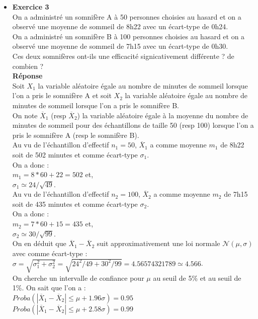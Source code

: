 \documentclass[a4paper,11pt]{book}
\begin{document}
\begin{itemize}
\item{\bf Exercice 3}\\
On a administr\'e un somnif\`ere A \`a 50 personnes choisies au hasard et on a 
observ\'e une moyenne de sommeil de 8h22 avec un \'ecart-type de 0h24.\\ 
On a administr\'e un somnif\`ere B \`a 100 personnes choisies au hasard et on a
observ\'e une moyenne de sommeil de 7h15 avec un \'ecart-type de 0h30.\\ 
Ces deux somnif\`eres ont-ils une efficacit\'e signicativement diff\'erente ? 
de combien ?\\
{\bf R\'eponse}\\
Soit $X_1$ la variable al\'eatoire \'egale au nombre de minutes de sommeil 
lorsque l'on a pris le somnif\`ere A et soit $X_2$ la variable al\'eatoire \'egale au nombre de minutes de sommeil lorsque l'on a pris le somnif\`ere B.\\
On note  $\overline X_1$ (resp $\overline X_2$) la variable al\'eatoire \'egale
\`a la  moyenne du nombre de minutes de sommeil pour des \'echantillons de 
taille 50 (resp 100) lorsque l'on a pris le somnif\`ere A
(resp le somnif\`ere B).\\
Au vu de l'\'echantillon d'effectif $n_1=50$, $\overline X_1$ a comme 
moyenne $m_1$ de 8h22 soit de 502 minutes et comme \'ecart-type $\sigma_1$.\\
On a donc :\\
$m_1=8*60+22=502$ et,\\ 
$\sigma_1 \simeq 24/\sqrt{49}$.\\
Au vu de l'\'echantillon d'effectif $n_2=100$, $\overline X_2$ a comme moyenne 
$m_2$ de 7h15 soit de 435 minutes et comme \'ecart-type $\sigma_2$.\\
On a donc :\\
$m_2=7*60+15=435$ et,\\ 
$\sigma_2\simeq 30/\sqrt{99}$.\\
On en d\'eduit que $\overline X_1-\overline X_2$ suit approximativement une 
loi normale $\mathcal N(\mu , \sigma)$ avec  comme \'ecart-type :\\
$\sigma=\sqrt{\sigma_1^2+\sigma_2^2}=\sqrt{24^2/49+30^2/99}=4.56574321789\simeq 4.566$.\\
On cherche un intervalle de confiance pour $\mu$ au seuil de 5\% et au seuil 
de 1\%. On sait que l'on a :\\
$Proba(|\overline X_1-\overline X_2| \leq \mu+1.96\sigma)=0.95$\\
$Proba(|\overline X_1-\overline X_2| \leq \mu+2.58\sigma)=0.99$\\

\end{itemize}
\end{document}

